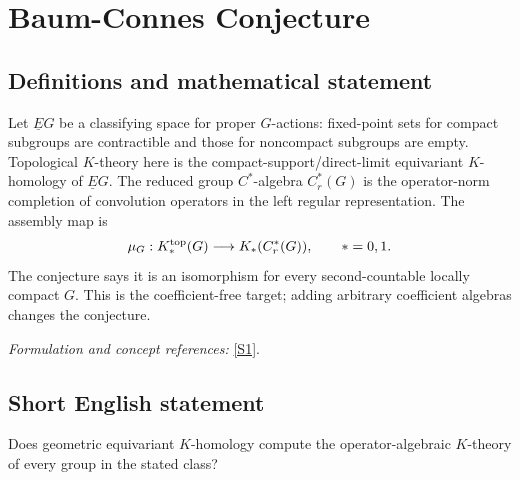 \documentclass[11pt]{article}
\newcommand{\sref}[2]{\hyperlink{source:#1:#2}{[S#2]}}
\newif\ifshowcatalogue
\newcommand{\cataloguescope}[1]{\ifshowcatalogue
 \paragraph{Exact scope in the supplied catalogue.}
 \begin{quote}\small #1\end{quote}\fi}
\begin{document}
\setcounter{section}{0}
\clearpage
\section*{\texorpdfstring{Baum-Connes Conjecture}{Baum-Connes Conjecture}}\label{statement}
\subsection{Definitions and mathematical statement}
Let $\underline EG$ be a classifying space for proper $G$-actions: fixed-point sets for compact subgroups are contractible and those for noncompact subgroups are empty. Topological $K$-theory here is the compact-support/direct-limit equivariant $K$-homology of $\underline EG$. The reduced group $C^*$-algebra $C_r^*(G)$ is the operator-norm completion of convolution operators in the left regular representation. The assembly map is
\[
 \mu_G:K_*^{\rm top}(G)\longrightarrow K_*(C_r^*(G)),\qquad *=0,1.
\]
The conjecture says it is an isomorphism for every second-countable locally compact $G$. This is the coefficient-free target; adding arbitrary coefficient algebras changes the conjecture.
\par\smallskip\textit{Formulation and concept references:} \sref{statement}{1}.
\cataloguescope{Prove the Baum-Connes conjecture for every second-countable locally compact group G: the assembly map K\_top(G) \ensuremath{\to} K(C*\_r(G)) from the topological K-theory of the group, built from the classifying space for proper actions, to the K-theory of the reduced group C*-algebra is an isomorphism.}
\subsection{Short English statement}
Does geometric equivariant $K$-homology compute the operator-algebraic $K$-theory of every group in the stated class?
\end{document}
